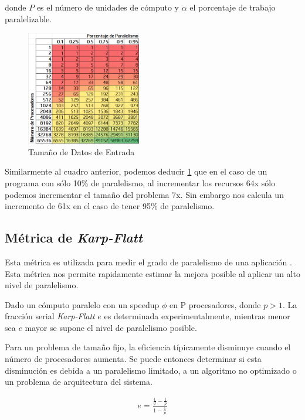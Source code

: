 \documentclass[a4paper]{report}
\begin{document}
donde $ P $ es el n\'umero de unidades de c\'omputo y $ \alpha $ el porcentaje de trabajo paralelizable.

\begin{figure}[H]
\label{fig:gustafson}
\begin{center}
\includegraphics[width=5cm]{gustafson.png}
\caption{Tama\~no de Datos de Entrada}
\end{center}
\end{figure}

Similarmente al cuadro anterior, podemos deducir \ref{fig:gustafson} que en el caso de un programa con s\'olo 10\% de paralelismo,
al incrementar los recursos 64x s\'olo podemos incrementar el tama\~no del problema 7x. Sin embargo nos calcula
un incremento de 61x en el caso de tener 95\% de paralelismo.

\subsection{M\'etrica de {\it Karp-Flatt}}

Esta m\'etrica es utilizada para medir el grado de paralelismo de una aplicaci\'on \cite{karp-flatt}.
Esta m\'etrica nos permite rapidamente estimar la mejora posible al aplicar un alto nivel de paralelismo.

\bigskip

Dado un c\'omputo paralelo con un speedup $ \phi $ en P procesadores, donde $ p > 1 $.
La fracci\'on serial {\it Karp-Flatt} $ e $ es determinada experimentalmente, mientras menor sea $ e $
mayor se supone el nivel de paralelismo posible.

Para un problema de tama\~no fijo, la eficiencia t\'ipicamente disminuye cuando
el n\'umero de procesadores aumenta. Se puede entonces determinar si esta disminuci\'on
es debida a un paralelismo limitado, a un algoritmo no optimizado o un problema de
arquitectura del sistema.

\begin{eqnarray}
 e = \frac{\frac{1}{\psi} - \frac{1}{p}}{1 - \frac{1}{p}} 
\end{eqnarray}
\end{document}
